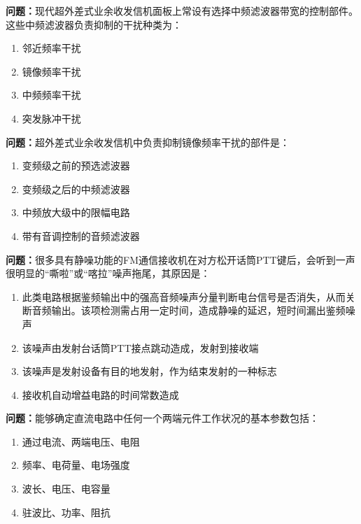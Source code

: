 \bigskip


\noindent\textbf{问题：}现代超外差式业余收发信机面板上常设有选择中频滤波器带宽的控制部件。这些中频滤波器负责抑制的干扰种类为：
\begin{enumerate}[label=\Alph*), leftmargin=3em]
\item 邻近频率干扰
\item 镜像频率干扰
\item 中频频率干扰
\item 突发脉冲干扰
\end{enumerate}

\bigskip


\noindent\textbf{问题：}超外差式业余收发信机中负责抑制镜像频率干扰的部件是：
\begin{enumerate}[label=\Alph*), leftmargin=3em]
\item 变频级之前的预选滤波器
\item 变频级之后的中频滤波器
\item 中频放大级中的限幅电路
\item 带有音调控制的音频滤波器
\end{enumerate}

\bigskip


\noindent\textbf{问题：}很多具有静噪功能的FM通信接收机在对方松开话筒PTT键后，会听到一声很明显的“嘶啦”或“喀拉”噪声拖尾，其原因是：
\begin{enumerate}[label=\Alph*), leftmargin=3em]
\item 此类电路根据鉴频输出中的强高音频噪声分量判断电台信号是否消失，从而关断音频输出。该项检测需占用一定时间，造成静噪的延迟，短时间漏出鉴频噪声
\item 该噪声由发射台话筒PTT接点跳动造成，发射到接收端
\item 该噪声是发射设备有目的地发射，作为结束发射的一种标志
\item 接收机自动增益电路的时间常数造成
\end{enumerate}

\bigskip


\noindent\textbf{问题：}能够确定直流电路中任何一个两端元件工作状况的基本参数包括：
\begin{enumerate}[label=\Alph*), leftmargin=3em]
\item 通过电流、两端电压、电阻
\item 频率、电荷量、电场强度
\item 波长、电压、电容量
\item 驻波比、功率、阻抗
\end{enumerate}

